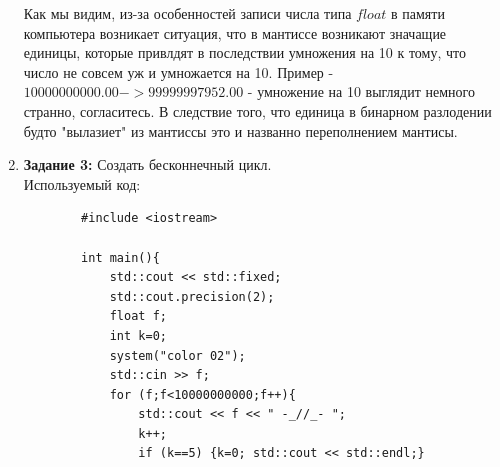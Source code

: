 \documentclass[a4paper, 12pt]{article}
\begin{document}
\begin{enumerate}
        Как мы видим, из-за особенностей записи числа типа $float$ в памяти компьютера возникает ситуация, что в мантиссе возникают значащие единицы, которые привлдят в последствии умножения на 10 к тому, что число не совсем уж и умножается на 10. Пример - $10000000000.00 -> 99999997952.00$ - умножение на 10 выглядит немного странно, согласитесь. В следствие того, что единица в бинарном разлодении будто "вылазиет" из мантиссы это и названно переполнением мантисы.  
        \[\]
        \item \textbf{Задание 3:} Создать бесконнечный цикл.
        \[\]
        Используемый код:
        \begin{lstlisting}
        #include <iostream>
        
        int main(){
            std::cout << std::fixed;
            std::cout.precision(2);
            float f;
            int k=0;
            system("color 02");
            std::cin >> f;
            for (f;f<10000000000;f++){
                std::cout << f << " -_//_- ";
                k++;
                if (k==5) {k=0; std::cout << std::endl;}
        

\end{lstlisting}
\end{enumerate}
\end{document}
